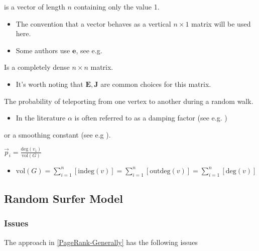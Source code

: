 \documentclass[11pt]{article}
\begin{document}
\begin{description}
\item[{\(\vec{1}\)}] is a vector of length \(n\) containing only the value 1.
\begin{itemize}
\item The convention that a vector behaves as a vertical \(n \times 1\) matrix will be used here.
\item Some authors use \(\mathbf{e}\), see e.g. \cite{langvilleGooglePageRankScience2012}
\end{itemize}
\item[{\(\mathbf{J} = \vec{1}\cdot \vec{1}^{\mathrm{T}} \iff \mathbf{J}_{i,j} = 1\)}] Is a completely dense \(n \times n\) matrix.
\begin{itemize}
\item It's worth noting that \(\mathbf{E}, \mathbf{J}\) are common choices for this matrix.
\end{itemize}
\item[{\(\alpha\)}] The probability of teleporting from one vertex to another during a random walk.
\begin{itemize}
\item In the literature \(\alpha\) is often referred to as a damping factor (see e.g.  \cite{berkhoutRankingNodesGeneral2018a,brinkmeierPageRankRevisited2006a,fuDampingFactorGoogle2006,kamvarAdaptiveMethodsComputation2004b,bianchiniPageRank2005})
\end{itemize}
or a smoothing constant (see e.g \cite{koppelMeasuringDirectIndirect2014}).
\item \(\vec{p}_{i} = \frac{\mathrm{deg}(v_{1})}{\mathrm{vol}(G)}\)
\begin{itemize}
\item \(\mathrm{vol}(G) = \sum^{n}_{i = 1} \left[ \mathrm{indeg}(v) \right] = \sum^{n}_{i = 1} \left[ \mathrm{outdeg}(v) \right ] = \sum^{n}_{i = 1} \left[ \mathrm{deg}(v) \right]\)
\end{itemize}
\end{description}

\subsection{Random Surfer Model}
\label{sec:orga874311}
\subsubsection{Issues}
\label{issues}
The approach in \ref{PageRank-Generally} has the following issues
\end{document}
